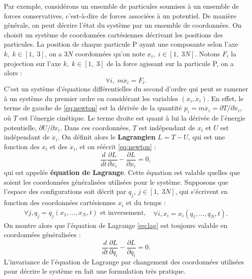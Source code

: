 Par exemple, considérons un ensemble de particules soumises à un ensemble de forces conservatives, c'est-à-dire de forces associées à un potentiel. De manière générale, on peut décrire l'état du système par un ensemble de coordonnées. On choisit un système de coordonnées cartésiennes décrivant les positions des particules. La position de chaque particule P ayant une composante selon l'axe $k,\;k\in[1,\;3]$, on a $3N$ coordonnées qu'on note $x_i,\; i\in[1,\;3N]$. Notons $F_i$ la projection sur l'axe $k,\;k\in[1,\;3]$ de la force agissant sur la particule P, on a alors :
\begin{equation}
\label{eq:newton}
\forall i,\;m\ddot{x}_i = F_i.
\end{equation}
C'est un système d'équations différentielles du second d'ordre qui peut se ramener à un système du premier ordre en considérant les variables $(x_i,\dot{x}_i)$. En effet, le terme de gauche de \ref{eq:newton} est la dérivée de la quantité
$p_i=m\dot{x}_i=\partial T/\partial\dot{x}_i$, où $T$ est l'énergie cinétique. Le terme droite est quant à lui la dérivée de l'énergie potentielle, $\partial U/\partial x_i$. Dans ces coordonnées, $T$ est indépendant de $x_i$ et $U$ est indépendant de $\dot{x}_i$. On définit alors le \textbf{Lagrangien} $L=T-U$, qui est une fonction des $x_i$ et des $\dot{x}_i$, et on réécrit \ref{eq:newton} :
\begin{equation}
\label{eq:lag}
\frac{d}{dt}\frac{\partial L}{\partial \dot{x}_i}-\frac{\partial L}{\partial x_i}=0,
\end{equation}
qui est appelée \textbf{équation de Lagrange}. Cette équation est valable quelles que soient les coordonnées généralisées utilisées pour le système. Supposons que l'espace des configurations soit décrit par ${q_j}$, $j\in[1,\;3N]$, qui s'écrivent en fonction des coordonnées cartésiennes ${x_i}$ et du temps :
\begin{equation}
\begin{split}
\forall j, q_j=q_j(x_1,\ldots,x_N,t)\text{ et inversement, }
\end{split}
\begin{split}
\forall i, x_i=x_i(q_1,\ldots,q_N,t).
\end{split}
\end{equation}
On montre alors que l'équation de Lagrange \ref{eq:lag} est toujours valable en coordonnées généralisées :
\begin{equation}
\label{eq:lagq}
\frac{d}{dt}\frac{\partial L}{\partial \dot{q}_i}-\frac{\partial L}{\partial q_i}=0.
\end{equation}
L'invariance de l'équation de Lagrange par changement des coordonnées utilisées pour décrire le système en fait une formulation très pratique.

